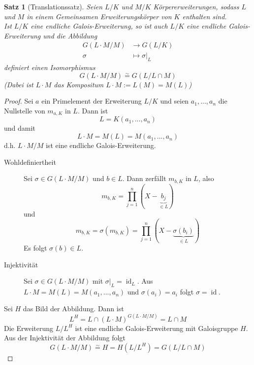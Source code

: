 \documentclass[10pt,a4paper]{article}
\newcommand{\id}{\operatorname{id}}
\newcommand{\isom}{\overset{\sim}{=}}
\theoremstyle{plain}
\newtheorem{satz}[theorem]{Satz}
\theoremstyle{definition}
\theoremstyle{remark}
\begin{document}
	\begin{satz}[Translationssatz]
		Seien $L/K$ und $M/K$ Körpererweiterungen, sodass $L$ und $M$ in einem Gemeinsamen Erweiterungskörper von $K$ enthalten sind.\\
		Ist $L/K$ eine endliche Galois-Erweiterung, so ist auch $L/K$ eine endliche Galois-Erweiterung und die Abbildung
		\begin{align*}
		G(L\cdot M/M)&\to G(L/K)\\
		\sigma&\mapsto\sigma|_L
		\end{align*}
		definiert einen Isomorphismus 
		\[G({L\cdot M}/M)\isom G(L/{L\cap M})\]
		(Dabei ist $L\cdot M$ das Kompositum $L\cdot M:=L(M)=M(L)$)
	\end{satz}
	\begin{proof}
		Sei $a$ ein Primelement der Erweiterung $L/K$ und seien $a_1,...,a_n$ die Nullstelle von $m_{a,K}$ in $L$. Dann ist
		\[L=K(a_1,...,a_n)\]
		und damit
		\[L\cdot M=M(L)=M(a_1,...,a_n)\]
		d.h. ${L\cdot M}/M$ ist eine endliche Galois-Erweiterung.\\
		\begin{description}
			\item[Wohldefiniertheit] Sei $\sigma\in G({L\cdot M}/M)$ und $b\in L$. Dann zerfällt $m_{b,K}$ in $L$, also
			\[m_{b,K}=\prod_{j=1}^n(X-\underbrace{b_j}_{\in L})\]
			und
			\[m_{b,K}=\sigma(m_{b,K})=\prod_{j=1}^{n}(X-\underbrace{\sigma(b_i)}_{\in L})\]
			Es folgt $\sigma(b)\in L$.\\
			\item[Injektivität] Sei $\sigma\in G({L\cdot M}/M)$ mit $\sigma|_L=\id_L$. Aus $L\cdot M=M(L)=M(a_1,...,a_n)$ und $\sigma(a_i)=a_i$ folgt $\sigma=\id$.
		\end{description}
		Sei $H$ das Bild der Abbildung. Dann ist
		\[L^H=L\cap (L\cdot M)^{G({L\cdot M}/M)}=L\cap M\]
		Die Erweiterung $L/L^H$ ist eine endliche Galois-Erweiterung mit Galoisgruppe $H$. Aus der Injektivität der Abbildung folgt
		\[G({L\cdot M}/M)\isom H=H(L/L^H)=G(L/{L\cap M})\]
	\end{proof}
\end{document}
